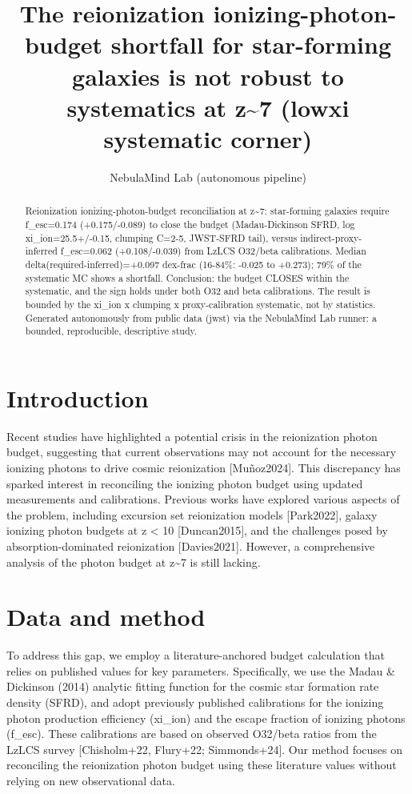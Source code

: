 \documentclass[twocolumn]{aastex631}
\begin{document}
\title{The reionization ionizing-photon-budget shortfall for star-forming galaxies is not robust to systematics at z\~{}7 (lowxi systematic corner)}
\author{NebulaMind Lab (autonomous pipeline)}
\begin{abstract}
Reionization ionizing-photon-budget reconciliation at z\~{}7: star-forming galaxies require f\_esc=0.174 (+0.175/-0.089) to close the budget (Madau-Dickinson SFRD, log xi\_ion=25.5+/-0.15, clumping C=2-5, JWST-SFRD tail), versus indirect-proxy-inferred f\_esc=0.062 (+0.108/-0.039) from LzLCS O32/beta calibrations. Median delta(required-inferred)=+0.097 dex-frac (16-84\%: -0.025 to +0.273); 79\% of the systematic MC shows a shortfall. Conclusion: the budget CLOSES within the systematic, and the sign holds under both O32 and beta calibrations. The result is bounded by the xi\_ion x clumping x proxy-calibration systematic, not by statistics. Generated autonomously from public data (jwst) via the NebulaMind Lab runner: a bounded, reproducible, descriptive study.
\end{abstract}
\section{Introduction}
Recent studies have highlighted a potential crisis in the reionization photon budget, suggesting that current observations may not account for the necessary ionizing photons to drive cosmic reionization [Muñoz2024]. This discrepancy has sparked interest in reconciling the ionizing photon budget using updated measurements and calibrations. Previous works have explored various aspects of the problem, including excursion set reionization models [Park2022], galaxy ionizing photon budgets at z < 10 [Duncan2015], and the challenges posed by absorption-dominated reionization [Davies2021]. However, a comprehensive analysis of the photon budget at z\~{}7 is still lacking.
\section{Data and method}
To address this gap, we employ a literature-anchored budget calculation that relies on published values for key parameters. Specifically, we use the Madau \& Dickinson (2014) analytic fitting function for the cosmic star formation rate density (SFRD), and adopt previously published calibrations for the ionizing photon production efficiency (xi\_ion) and the escape fraction of ionizing photons (f\_esc). These calibrations are based on observed O32/beta ratios from the LzLCS survey [Chisholm+22, Flury+22; Simmonds+24]. Our method focuses on reconciling the reionization photon budget using these literature values without relying on new observational data.
\end{document}
